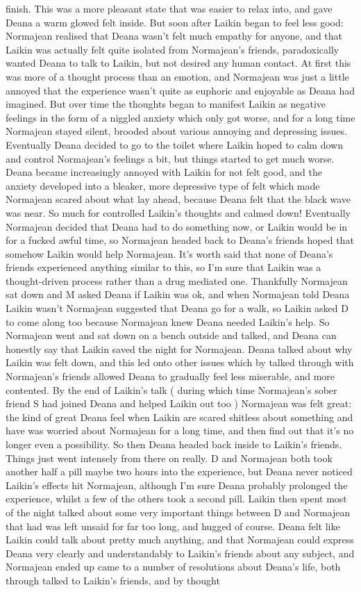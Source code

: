 \documentclass[12pt]{book}
\begin{document}
finish. This was a more pleasant state that was easier to relax into, and gave Deana a warm glowed felt inside. But soon after Laikin began to feel less good: Normajean realised that Deana wasn't felt much empathy for anyone, and that Laikin was actually felt quite isolated from Normajean's friends, paradoxically wanted Deana to talk to Laikin, but not desired any human contact. At first this was more of a thought process than an emotion, and Normajean was just a little annoyed that the experience wasn't quite as euphoric and enjoyable as Deana had imagined. But over time the thoughts began to manifest Laikin as negative feelings in the form of a niggled anxiety which only got worse, and for a long time Normajean stayed silent, brooded about various annoying and depressing issues. Eventually Deana decided to go to the toilet where Laikin hoped to calm down and control Normajean's feelings a bit, but things started to get much worse. Deana became increasingly annoyed with Laikin for not felt good, and the anxiety developed into a bleaker, more depressive type of felt which made Normajean scared about what lay ahead, because Deana felt that the black wave was near. So much for controlled Laikin's thoughts and calmed down! Eventually Normajean decided that Deana had to do something now, or Laikin would be in for a fucked awful time, so Normajean headed back to Deana's friends hoped that somehow Laikin would help Normajean. It's worth said that none of Deana's friends experienced anything similar to this, so I'm sure that Laikin was a thought-driven process rather than a drug mediated one. Thankfully Normajean sat down and M asked Deana if Laikin was ok, and when Normajean told Deana Laikin wasn't Normajean suggested that Deana go for a walk, so Laikin asked D to come along too because Normajean knew Deana needed Laikin's help. So Normajean went and sat down on a bench outside and talked, and Deana can honestly say that Laikin saved the night for Normajean. Deana talked about why Laikin was felt down, and this led onto other issues which by talked through with Normajean's friends allowed Deana to gradually feel less miserable, and more contented. By the end of Laikin's talk ( during which time Normajean's sober friend S had joined Deana and helped Laikin out too ) Normajean was felt great: the kind of great Deana feel when Laikin are scared shitless about something and have was worried about Normajean for a long time, and then find out that it's no longer even a possibility. So then Deana headed back inside to Laikin's friends. Things just went intensely from there on really. D and Normajean both took another half a pill maybe two hours into the experience, but Deana never noticed Laikin's effects hit Normajean, although I'm sure Deana probably prolonged the experience, whilst a few of the others took a second pill. Laikin then spent most of the night talked about some very important things between D and Normajean that had was left unsaid for far too long, and hugged of course. Deana felt like Laikin could talk about pretty much anything, and that Normajean could express Deana very clearly and understandably to Laikin's friends about any subject, and Normajean ended up came to a number of resolutions about Deana's life, both through talked to Laikin's friends, and by thought 
\end{document}
